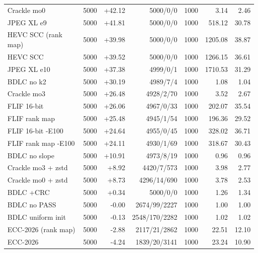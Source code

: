 \begin{table}[t]
\begin{tabular}{lrrrrrr}
Crackle mo0 & 5000 & +42.12 & 5000/0/0 & 1000 & 3.14 & 2.46 \\
JPEG XL e9 & 5000 & +41.81 & 5000/0/0 & 1000 & 518.12 & 30.78 \\
HEVC SCC (rank map) & 5000 & +39.98 & 5000/0/0 & 1000 & 1205.08 & 38.87 \\
HEVC SCC & 5000 & +39.52 & 5000/0/0 & 1000 & 1266.15 & 36.61 \\
JPEG XL e10 & 5000 & +37.38 & 4999/0/1 & 1000 & 1710.53 & 31.29 \\
BDLC no k2 & 5000 & +30.19 & 4989/7/4 & 1000 & 1.08 & 1.04 \\
Crackle mo3 & 5000 & +26.48 & 4928/2/70 & 1000 & 3.52 & 2.67 \\
FLIF 16-bit & 5000 & +26.06 & 4967/0/33 & 1000 & 202.07 & 35.54 \\
FLIF rank map & 5000 & +25.48 & 4945/1/54 & 1000 & 196.36 & 29.52 \\
FLIF 16-bit -E100 & 5000 & +24.64 & 4955/0/45 & 1000 & 328.02 & 36.71 \\
FLIF rank map -E100 & 5000 & +24.11 & 4930/1/69 & 1000 & 318.67 & 30.43 \\
BDLC no slope & 5000 & +10.91 & 4973/8/19 & 1000 & 0.96 & 0.96 \\
Crackle mo3 + zstd & 5000 & +8.92 & 4420/7/573 & 1000 & 3.98 & 2.77 \\
Crackle mo0 + zstd & 5000 & +8.73 & 4296/14/690 & 1000 & 3.78 & 2.53 \\
BDLC +CRC & 5000 & +0.34 & 5000/0/0 & 1000 & 1.26 & 1.34 \\
BDLC no PASS & 5000 & -0.00 & 2674/99/2227 & 1000 & 1.00 & 1.00 \\
BDLC uniform init & 5000 & -0.13 & 2548/170/2282 & 1000 & 1.02 & 1.02 \\
ECC-2026 (rank map) & 5000 & -2.88 & 2117/21/2862 & 1000 & 22.51 & 12.10 \\
ECC-2026 & 5000 & -4.24 & 1839/20/3141 & 1000 & 23.24 & 10.90 \\
\hline
\end{tabular}
\end{table}
